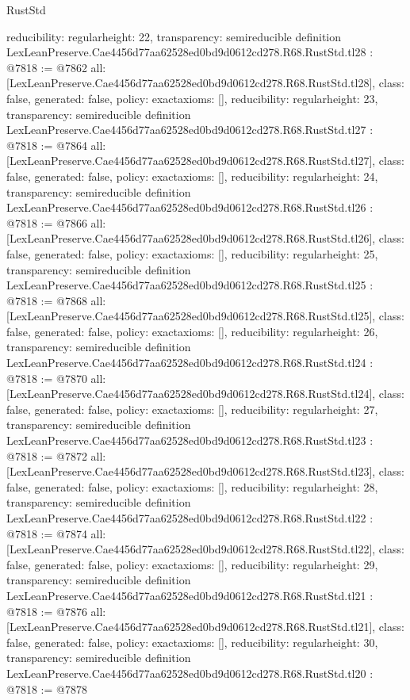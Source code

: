 \begin{lexlean}{RustStd}
\begin{coremodule}
{  reducibility: regular{height: 22},
  transparency: semireducible
}
definition LexLeanPreserve.Cae4456d77aa62528ed0bd9d0612cd278.R68.RustStd.tl28 : @7818 := @7862 {
  all: [LexLeanPreserve.Cae4456d77aa62528ed0bd9d0612cd278.R68.RustStd.tl28],
  class: false,
  generated: false,
  policy: exact{axioms: []},
  reducibility: regular{height: 23},
  transparency: semireducible
}
definition LexLeanPreserve.Cae4456d77aa62528ed0bd9d0612cd278.R68.RustStd.tl27 : @7818 := @7864 {
  all: [LexLeanPreserve.Cae4456d77aa62528ed0bd9d0612cd278.R68.RustStd.tl27],
  class: false,
  generated: false,
  policy: exact{axioms: []},
  reducibility: regular{height: 24},
  transparency: semireducible
}
definition LexLeanPreserve.Cae4456d77aa62528ed0bd9d0612cd278.R68.RustStd.tl26 : @7818 := @7866 {
  all: [LexLeanPreserve.Cae4456d77aa62528ed0bd9d0612cd278.R68.RustStd.tl26],
  class: false,
  generated: false,
  policy: exact{axioms: []},
  reducibility: regular{height: 25},
  transparency: semireducible
}
definition LexLeanPreserve.Cae4456d77aa62528ed0bd9d0612cd278.R68.RustStd.tl25 : @7818 := @7868 {
  all: [LexLeanPreserve.Cae4456d77aa62528ed0bd9d0612cd278.R68.RustStd.tl25],
  class: false,
  generated: false,
  policy: exact{axioms: []},
  reducibility: regular{height: 26},
  transparency: semireducible
}
definition LexLeanPreserve.Cae4456d77aa62528ed0bd9d0612cd278.R68.RustStd.tl24 : @7818 := @7870 {
  all: [LexLeanPreserve.Cae4456d77aa62528ed0bd9d0612cd278.R68.RustStd.tl24],
  class: false,
  generated: false,
  policy: exact{axioms: []},
  reducibility: regular{height: 27},
  transparency: semireducible
}
definition LexLeanPreserve.Cae4456d77aa62528ed0bd9d0612cd278.R68.RustStd.tl23 : @7818 := @7872 {
  all: [LexLeanPreserve.Cae4456d77aa62528ed0bd9d0612cd278.R68.RustStd.tl23],
  class: false,
  generated: false,
  policy: exact{axioms: []},
  reducibility: regular{height: 28},
  transparency: semireducible
}
definition LexLeanPreserve.Cae4456d77aa62528ed0bd9d0612cd278.R68.RustStd.tl22 : @7818 := @7874 {
  all: [LexLeanPreserve.Cae4456d77aa62528ed0bd9d0612cd278.R68.RustStd.tl22],
  class: false,
  generated: false,
  policy: exact{axioms: []},
  reducibility: regular{height: 29},
  transparency: semireducible
}
definition LexLeanPreserve.Cae4456d77aa62528ed0bd9d0612cd278.R68.RustStd.tl21 : @7818 := @7876 {
  all: [LexLeanPreserve.Cae4456d77aa62528ed0bd9d0612cd278.R68.RustStd.tl21],
  class: false,
  generated: false,
  policy: exact{axioms: []},
  reducibility: regular{height: 30},
  transparency: semireducible
}
definition LexLeanPreserve.Cae4456d77aa62528ed0bd9d0612cd278.R68.RustStd.tl20 : @7818 := @7878 {
}
\end{coremodule}
\end{lexlean}
